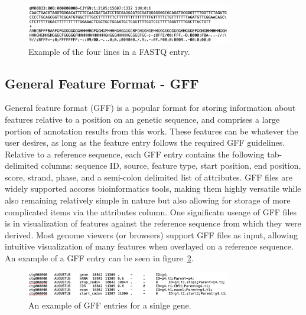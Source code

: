 \begin{figure}
  \centering
  \includegraphics[width=0.8\textwidth]{figures/fastq-example.png}
  \caption{Example of the four lines in a FASTQ entry.}
  \label{fig:fastq-example}
\end{figure}

\subsection{General Feature Format - GFF}
General feature format (GFF) is a popular format for storing
information about features relative to a position on an genetic
sequence, and comprises a large portion of annotation results from
this work. These features can be whatever the user desires, as long as
the feature entry follows the required GFF guidelines. Relative to a
reference sequence, each GFF entry contains the following
tab-delimited columns: sequence ID, source, feature type, start
position, end position, score, strand, phase, and a semi-colon
delimited list of attributes. GFF files are widely supported accorss
bioinformatics tools, making them highly versatile while also
remaining relatively simple in nature but also allowing for storage of
more complicated items via the attributes column. One significatn
useage of GFF files is in visualization of features against the
reference sequence from which they were derived. Most genome viewers
(or browsers) support GFF files as input, allowing intuitive
visualization of many features when overlayed on a reference
sequence. An example of a GFF entry can be seen in
figure~\ref{fig:gff-example}.

\begin{figure}
  \centering
  \includegraphics[width=0.8\textwidth]{figures/gff-example.png}
  \caption{An example of GFF entries for a sinlge gene.}
  \label{fig:gff-example}
\end{figure}
